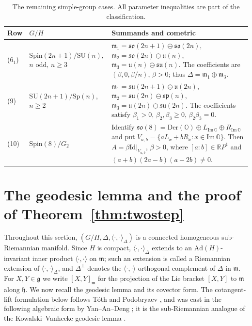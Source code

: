 \documentclass[12pt]{amsart}
\theoremstyle{plain}
\theoremstyle{definition}
\theoremstyle{remark}
\newcommand{\alg}[1]{\mathfrak{#1}}
\newcommand{\RR}{\mathbb{R}}
\newcommand{\OO}{\mathbb{O}}
\newcommand{\Idm}{\mathrm{Id}}
\begin{document}
\begin{table}[htbp]
\centering
\caption{The remaining simple-group cases. All parameter inequalities are part of the
classification.}
\label{tab:rem}
\begin{tabular}{@{}l l p{2.7in}@{}}
\toprule
Row & $G/H$ & Summands and cometric\\
\midrule
(6$_1$) & $\mathrm{Spin}(2n{+}1)/\mathrm{SU}(n)$, $n$ odd, $n\ge3$ &
$\alg{m}_1=\alg{so}(2n{+}1)\ominus\alg{so}(2n)$, $\alg{m}_2=\alg{so}(2n)\ominus\alg{u}(n)$,
$\alg{m}_3=\alg{u}(n)\ominus\alg{su}(n)$. The coefficients are $(\beta,0,\beta/n)$, $\beta>0$;
thus $\Delta=\alg{m}_1\oplus\alg{m}_3$.\\[4pt]
(9) & $\mathrm{SU}(2n{+}1)/\mathrm{Sp}(n)$, $n\ge2$ &
$\alg{m}_1=\alg{su}(2n{+}1)\ominus\alg{u}(2n)$, $\alg{m}_2=\alg{su}(2n)\ominus\alg{sp}(n)$,
$\alg{m}_3=\alg{u}(2n)\ominus\alg{su}(2n)$. The coefficients satisfy $\beta_1>0$,
$\beta_2,\beta_3\ge0$, $\beta_2\beta_3=0$.\\[4pt]
(10) & $\mathrm{Spin}(8)/G_2$ &
Identify $\alg{so}(8)=\mathrm{Der}(\OO)\oplus L_{\mathrm{Im}\,\OO}\oplus R_{\mathrm{Im}\,\OO}$ and
put $V_{a,b}=\{aL_x+bR_x:x\in\mathrm{Im}\,\OO\}$. Then $A=\beta\Idm|_{V_{a,b}}$, $\beta>0$, where
$[a:b]\in\RR P^1$ and $(a+b)(2a-b)(a-2b)\neq0$.\\
\bottomrule
\end{tabular}
\end{table}


\section{The geodesic lemma and the proof of Theorem~\ref{thm:twostep}}\label{sec:geod}

Throughout this section, $(G/H,\Delta,\langle\cdot,\cdot\rangle_\Delta)$ is a connected
homogeneous sub-Riemannian manifold. Since $H$ is compact, $\langle\cdot,\cdot\rangle_\Delta$
extends to an $\mathrm{Ad}(H)$-invariant inner product $\langle\cdot,\cdot\rangle$ on
$\alg{m}$; such an extension is called a Riemannian extension of
$\langle\cdot,\cdot\rangle_\Delta$, and $\Delta^{\perp}$ denotes the
$\langle\cdot,\cdot\rangle$-orthogonal complement of $\Delta$ in $\alg{m}$. For $X,Y\in\alg{g}$
we write $[X,Y]_{\alg{m}}$ for the projection of the Lie bracket $[X,Y]$ to $\alg{m}$ along
$\alg{h}$.
We now recall the  geodesic lemma and its covector form.
The cotangent-lift formulation below follows T\'oth \cite{Toth} and Podobryaev \cite{Podobryaev},
and was cast in the following algebraic form by Yan--An--Deng \cite{YAD}; it is the
sub-Riemannian analogue of the Kowalski--Vanhecke geodesic lemma \cite{KowalskiVanhecke}.
\end{document}

